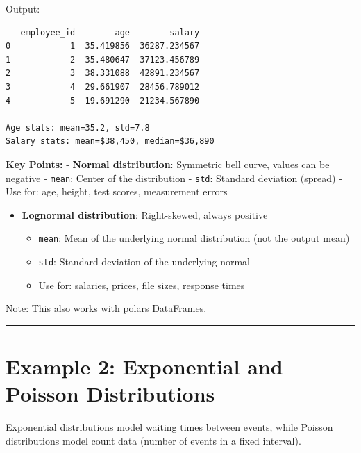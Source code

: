 \documentclass[
  letterpaper,
]{scrbook}
\providecommand{\tightlist}{%
  \setlength{\itemsep}{0pt}\setlength{\parskip}{0pt}}
\begin{document}
Output:

\begin{verbatim}
   employee_id        age        salary
0            1  35.419856  36287.234567
1            2  35.480647  37123.456789
2            3  38.331088  42891.234567
3            4  29.661907  28456.789012
4            5  19.691290  21234.567890

Age stats: mean=35.2, std=7.8
Salary stats: mean=$38,450, median=$36,890
\end{verbatim}

\textbf{Key Points:} - \textbf{Normal distribution}: Symmetric bell
curve, values can be negative - \texttt{mean}: Center of the
distribution - \texttt{std}: Standard deviation (spread) - Use for: age,
height, test scores, measurement errors

\begin{itemize}
\tightlist
\item
  \textbf{Lognormal distribution}: Right-skewed, always positive

  \begin{itemize}
  \tightlist
  \item
    \texttt{mean}: Mean of the underlying normal distribution (not the
    output mean)
  \item
    \texttt{std}: Standard deviation of the underlying normal
  \item
    Use for: salaries, prices, file sizes, response times
  \end{itemize}
\end{itemize}

Note: This also works with polars DataFrames.

\begin{center}\rule{0.5\linewidth}{0.5pt}\end{center}

\section{Example 2: Exponential and Poisson
Distributions}\label{example-2-exponential-and-poisson-distributions}

Exponential distributions model waiting times between events, while
Poisson distributions model count data (number of events in a fixed
interval).
\end{document}
